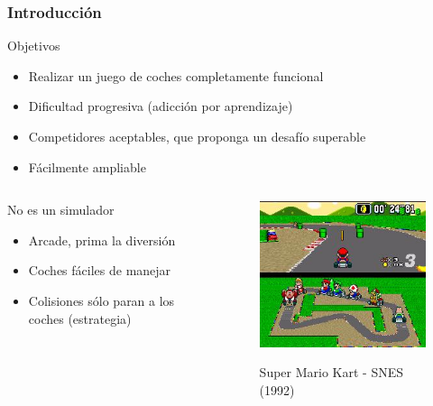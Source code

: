 \begin{frame}
    \frametitle{Introducción}

    \begin{block}{Objetivos}
        \begin{itemize}
            \item Realizar un juego de coches completamente funcional
            \item Dificultad progresiva (adicción por aprendizaje)
            \item Competidores aceptables, que proponga un desafío superable
            \item Fácilmente ampliable
        \end{itemize}
    \end{block}

    \begin{columns}
    
        \column{200px}
        \begin{alertblock}{No es un simulador}
            \begin{itemize}
                \item Arcade, prima la diversión
                \item Coches fáciles de manejar
                \item Colisiones sólo paran a los coches (estrategia)
            \end{itemize}
        \end{alertblock}
        
        \column{100px}
        \begin{figure}
          \label{logo_latex}
          \begin{center}
            \includegraphics[scale=0.5]{imagenes/super_mario_kart.jpg}
          \end{center}
          Super Mario Kart - SNES (1992)
        \end{figure}
        
    \end{columns}
    
\end{frame}
